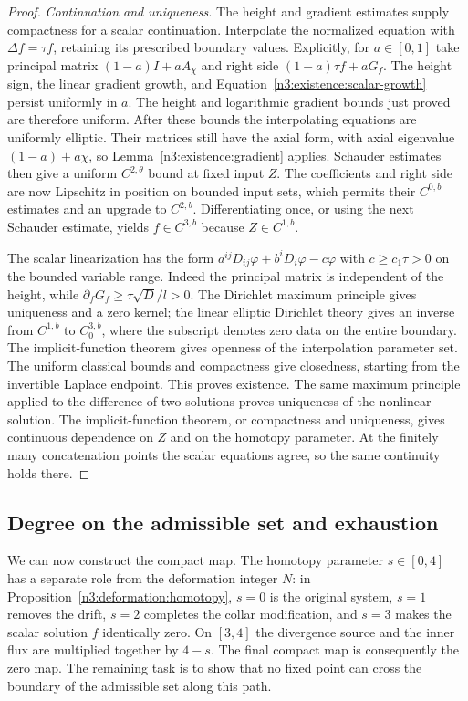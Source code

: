 \begin{proof}
\emph{Continuation and uniqueness.}
The height and gradient estimates supply compactness for a scalar
continuation. Interpolate the normalized equation with
$\Delta f=\tau f$, retaining its prescribed boundary values.  Explicitly,
for $a\in[0,1]$ take principal matrix
$(1-a)I+aA_\chi$ and right side
$(1-a)\tau f+aG_f$.  The height sign, the linear gradient growth,
and Equation~\eqref{n3:existence:scalar-growth} persist uniformly in
$a$.  The height and logarithmic gradient bounds just proved are
therefore uniform.  After these bounds the interpolating equations
are uniformly elliptic.  Their matrices still have the axial form,
with axial eigenvalue $(1-a)+a\chi$, so
Lemma~\ref{n3:existence:gradient} applies.  Schauder estimates then
give a uniform $C^{2,\theta}$ bound at fixed input $Z$.
The coefficients and right side are now Lipschitz in position on
bounded input sets, which permits their $C^{0,b}$ estimates and
an upgrade to $C^{2,b}$.  Differentiating once, or using the next
Schauder estimate, yields $f\in C^{3,b}$ because $Z\in C^{1,b}$.

The scalar linearization has the form
$a^{ij}D_{ij}\varphi+b^iD_i\varphi-c\varphi$ with
$c\ge c_1\tau>0$ on the bounded variable range.  Indeed the
principal matrix is independent of the height, while
$\partial_fG_f\ge\tau\sqrt D/l>0$.
The Dirichlet maximum principle gives uniqueness and a zero kernel;
the linear elliptic Dirichlet theory gives an inverse from
$C^{1,b}$ to $C^{3,b}_0$, where the subscript denotes zero data on
the entire boundary.  The
implicit-function theorem gives openness of the interpolation
parameter set.  The uniform classical bounds and compactness give
closedness, starting from the invertible Laplace endpoint.  This
proves existence.  The same maximum principle applied to the
difference of two solutions proves uniqueness of the nonlinear
solution.  The implicit-function theorem, or compactness and
uniqueness, gives continuous dependence on $Z$ and on the
homotopy parameter.  At the finitely many concatenation points the
scalar equations agree, so the same continuity holds there.
\end{proof}


\subsection{Degree on the admissible set and exhaustion}

We can now construct the compact map. The homotopy parameter
$s\in[0,4]$ has a separate role from the deformation integer $N$:
in Proposition~\ref{n3:deformation:homotopy}, $s=0$ is the original
system, $s=1$ removes the drift, $s=2$ completes the collar
modification, and $s=3$ makes the scalar solution $f$ identically
zero. On $[3,4]$ the divergence source and the inner flux are
multiplied together by $4-s$. The final compact map is consequently
the zero map. The remaining task is to show that no fixed point
can cross the boundary of the admissible set along this path.

